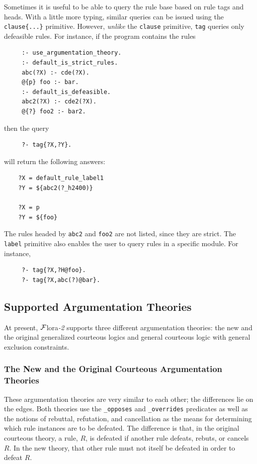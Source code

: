 \documentclass[11pt]{article}
\newcommand{\FLORA}{{\mbox{\sc ${\cal F}${lora}\rm\emph{-2}}}\xspace}
\begin{document}
Sometimes it is useful to be able to query the rule base based on rule
tags and heads. With a little more typing, similar queries can be issued
using the {\tt clause\{...\}} primitive. However, 
\emph{unlike} the {\tt clause} primitive, 
{\tt tag}  queries only defeasible rules. For instance, if the program
contains the rules
\begin{verbatim}
     :- use_argumentation_theory.
     :- default_is_strict_rules.
     abc(?X) :- cde(?X).
     @{p} foo :- bar.
     :- default_is_defeasible.
     abc2(?X) :- cde2(?X).
     @{?} foo2 :- bar2.
\end{verbatim}
then the query
\begin{verbatim}
     ?- tag{?X,?Y}.
\end{verbatim}
will return the following answers:
\begin{verbatim}
    ?X = default_rule_label1
    ?Y = ${abc2(?_h2400)}

    ?X = p
    ?Y = ${foo}
\end{verbatim}
The rules headed by {\tt abc2} and {\tt foo2} are not listed, since they
are strict.  
The {\tt label} primitive also enables the user to query rules in a specific
module. For instance,
\begin{verbatim}
     ?- tag{?X,?H@foo}.
     ?- tag{?X,abc(?)@bar}.
\end{verbatim}


\subsection{Supported Argumentation Theories}\label{sec-exclusion-constr}

At present, \FLORA supports three different argumentation theories: the new
and the original generalized courteous logics and general courteous
logic with general exclusion constraints.

\subsubsection{The New and the Original Courteous Argumentation Theories}

These argumentation theories are very similar to each other; the
differences lie on the edges. Both theories use the {\tt \_opposes} and
{\tt \_overrides} predicates as well as the notions of rebuttal,
refutation, and cancellation as the means for determining which rule
instances are to be defeated. The difference is that, in the original courteous
theory, a rule, $R$, is defeated if another rule defeats, rebuts, or
cancels $R$.
In the new theory, that other rule must not itself be defeated in order to
defeat $R$.
\end{document}
